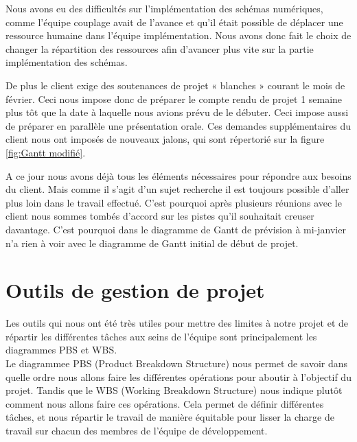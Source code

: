 \documentclass[a4paper,12pt]{report}
\theoremstyle{break}
\begin{document}
Nous avons eu des difficultés sur l’implémentation des schémas numériques, comme l’équipe couplage avait de l’avance et qu’il était possible de déplacer une ressource humaine dans l’équipe implémentation. Nous avons donc fait le choix de changer la répartition des ressources afin d’avancer plus vite sur la partie implémentation des schémas. 

De plus le client exige des soutenances de projet « blanches » courant le mois de février. Ceci nous impose donc de préparer le compte rendu de projet 1 semaine plus tôt que la date à laquelle nous avions prévu de le débuter. Ceci impose aussi de préparer en parallèle une présentation orale. Ces demandes supplémentaires du client nous ont imposés de nouveaux jalons, qui sont répertorié sur la figure \ref{fig:Gantt modifié}.

A ce jour nous avons déjà tous les éléments nécessaires pour répondre aux besoins du client. Mais comme il s’agit d’un sujet recherche il est toujours possible d’aller plus loin dans le travail effectué. C’est pourquoi après plusieurs réunions avec le client nous sommes tombés d’accord sur les pistes qu’il souhaitait creuser davantage. C’est pourquoi dans le diagramme de Gantt de prévision à mi-janvier n’a rien à voir avec le diagramme de Gantt initial de début de projet. 

\section{Outils de gestion de projet}

	Les outils qui nous ont été très utiles pour mettre des limites à notre projet et de répartir les différentes tâches aux seins de l'équipe sont principalement les diagrammes PBS et WBS.\\
	Le diagrammee PBS (Product Breakdown Structure) nous permet de savoir dans quelle ordre nous allons faire les différentes opérations pour aboutir à l'objectif du projet. Tandis que le WBS (Working Breakdown Structure) nous indique plutôt comment nous allons faire ces opérations. Cela permet de définir différentes tâches, et nous répartir le travail de manière équitable pour lisser la charge de travail sur chacun des membres de l'équipe de développement. 
	 
\end{document}
